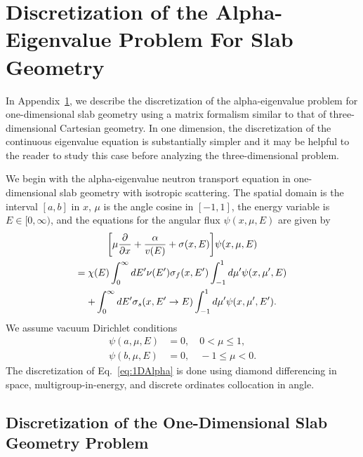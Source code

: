 \chapter[Discretization of the Alpha-Eigenvalue Problem For Slab Geometry][Discretized Slab Alpha-Eigenvalue Problem]{Discretization of the Alpha-Eigenvalue Problem For Slab Geometry}

\label{Discrete1D}

In Appendix~\ref{Discrete1D}, we describe the discretization of the alpha-eigenvalue problem for one-dimensional slab geometry using a matrix formalism similar to that of three-dimensional Cartesian geometry. In one dimension, the discretization of the continuous eigenvalue equation is substantially simpler and it may be helpful to the reader to study this case before analyzing the three-dimensional problem.

We begin with the alpha-eigenvalue neutron transport equation in one-dimensional slab geometry with isotropic scattering. The spatial domain is the interval $[a,b]$ in $x$, $\mu$ is the angle cosine in $[-1,1]$, the energy variable is $E \in [0, \infty)$, and the equations for the angular flux $\psi(x, \mu, E)$ are given by
\begin{multline}
\bigg [ \mu \frac{\partial}{\partial x} + \frac{\alpha}{v(E)} + \sigma(x,E) \bigg ] \psi(x,\mu,E) \\ = \chi(E) \int_{0}^{\infty} \mathop{}\!d E' \nu(E') \sigma_{f}(x,E') \int_{-1}^{1} \mathop{}\!d \mu' \psi(x,\mu',E) \\ + \int_{0}^{\infty} \mathop{}\!d E' \sigma_{s}(x, E' \rightarrow E) \int_{-1}^{1} \mathop{}\!d \mu' \psi(x,\mu',E').
\label{eq:1DAlpha}
\end{multline}
We assume vacuum Dirichlet conditions
\begin{align}
	\psi(a, \mu, E) &=0, \quad 0 < \mu \leq 1, \\
        \psi(b, \mu, E) &=0, \quad -1 \leq \mu < 0.
\end{align}
The discretization of Eq.~\ref{eq:1DAlpha} is done using diamond differencing in space, multigroup-in-energy, and discrete ordinates collocation in angle.

\section{Discretization of the One-Dimensional Slab Geometry Problem}


